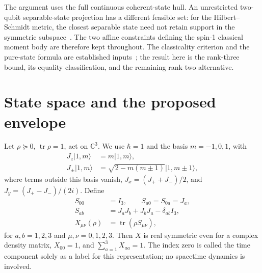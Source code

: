 \documentclass[aps,pra,reprint,amsmath,amssymb,superscriptaddress,longbibliography]{revtex4-2}
\newcommand{\tr}{\operatorname{tr}}
\newcommand{\Id}{I}
\newcommand{\ket}[1]{\lvert #1\rangle}
\begin{document}
The argument uses the full continuous coherent-state hull. An unrestricted two-qubit separable-state projection has a different feasible set: for the Hilbert--Schmidt metric, the closest separable state need not retain support in the symmetric subspace~\cite{BohnetTensor2016}. The two affine constraints defining the spin-1 classical moment body are therefore kept throughout. The classicality criterion and the pure-state formula are established inputs~\cite{Bohnet2016}; the result here is the rank-three bound, its equality classification, and the remaining rank-two alternative.

\section{State space and the proposed envelope}
\label{sec:model}

Let \(\rho\succeq0\), \(\tr\rho=1\), act on \(\mathbb C^3\). We use \(\hbar=1\) and the basis \(m=-1,0,1\), with
\begin{align}
 J_z\ket{1,m}&=m\ket{1,m},\nonumber\\
 J_\pm\ket{1,m}&=\sqrt{2-m(m\pm1)}\ket{1,m\pm1},
 \label{eq:spin}
\end{align}
where terms outside this basis vanish, \(J_x=(J_++J_-)/2\), and \(J_y=(J_+-J_-)/(2i)\). Define
\begin{align}
 S_{00}&=\Id_3,\qquad S_{a0}=S_{0a}=J_a,\nonumber\\
 S_{ab}&=J_aJ_b+J_bJ_a-\delta_{ab}\Id_3,\nonumber\\
 X_{\mu\nu}(\rho)&=\tr(\rho S_{\mu\nu}),
 \label{eq:moments}
\end{align}
for \(a,b=1,2,3\) and \(\mu,\nu=0,1,2,3\). Then \(X\) is real symmetric even for a complex density matrix, \(X_{00}=1\), and \(\sum_{a=1}^3X_{aa}=1\). The index zero is called the time component solely as a label for this representation; no spacetime dynamics is involved.
\end{document}
